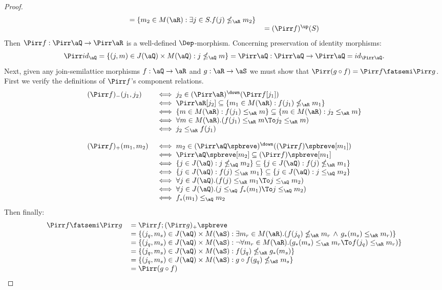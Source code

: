 \documentclass{article}
\begin{document}
\begin{proof}
\[\begin{tabular}{lll}
$= \{ m_2 \in M(\aR) : \exists j \in S. f(j)  \nleq_\aR m_2  \}$
\\&
$= (\Pirr f)^\up(S)$
\end{tabular}
\]
Then $\Pirr f : \Pirr \aQ \to  \Pirr\aR$ is a well-defined $\Dep$-morphism. Concerning preservation of identity morphisms:
\[
\Pirr id_\aQ 
= \{ (j,m) \in J(\aQ) \times M(\aQ) : j \nleq_\aQ m \} 
= \Pirr\aQ : \Pirr\aQ \to \Pirr\aQ
= id_{\Pirr\aQ}.
\]
Next, given any join-semilattice morphisms $f : \aQ \to \aR$ and $g : \aR \to \aS$ we must show that $\Pirr( g \circ f) = \Pirr f \fatsemi \Pirr g$. First we verify the definitions of $\Pirr f$'s component relations.
\[
\begin{tabular}{lll}
$(\Pirr f)_- (j_1,j_2)$
&
$\iff j_2 \in (\Pirr\aR)^\down(\Pirr f[j_1])$
\\&
$\iff \Pirr\aR[j_2] \subseteq \{ m_1 \in M(\aR) : f(j_1) \nleq_\aR m_1 \}$
\\&
$\iff \{ m \in M(\aR) : f(j_1) \leq_\aR m \} \subseteq \{ m \in M(\aR) : j_2 \leq_\aR m \}$
\\&
$\iff \forall m \in M(\aR).( f(j_1) \leq_\aR m \To j_2 \leq_\aR m  )$
\\&
$\iff j_2 \leq_\aR f(j_1)$
\\
\\
$(\Pirr f)_+ (m_1,m_2)$
&
$\iff  m_2 \in (\Pirr\aQ\spbreve)^\down((\Pirr f)\spbreve[m_1]) $
\\&
$\iff \Pirr\aQ\spbreve[m_2] \subseteq (\Pirr f)\spbreve[m_1]$
\\&
$\iff \{ j \in J(\aQ) : j \nleq_\aQ m_2 \} \subseteq \{ j \in J(\aQ) : f(j) \nleq_\aR m_1 \}  $
\\&
$\iff \{ j \in J(\aQ) : f(j) \leq_\aR m_1 \} \subseteq \{ j \in J(\aQ) : j \leq_\aQ m_2 \}   $
\\&
$\iff \forall j \in J(\aQ).( f(j) \leq_\aR m_1 \To j \leq_\aQ m_2)$
\\&
$\iff \forall j \in J(\aQ).( j \leq_\aQ f_*(m_1) \To j \leq_\aQ m_2 )$
\\&
$\iff f_*(m_1) \leq_\aQ m_2 $
\end{tabular}
\]
Then finally:
\[
\begin{tabular}{lll}
$\Pirr f \fatsemi \Pirr g$
&
$= \Pirr f ; (\Pirr g)_+\spbreve$
\\&
$= \{ (j_q,m_s) \in J(\aQ) \times M(\aS) : \exists m_r \in M(\aR).( f(j_q) \nleq_\aR m_r \,\land\, g_*(m_s) \leq_\aR m_r  ) \}$
\\&
$= \{ (j_q,m_s) \in J(\aQ) \times M(\aS) : \neg\forall m_r \in M(\aR).( g_*(m_s) \leq_\aR m_r \To  f(j_q) \leq_\aR m_r ) \}$
\\&
$= \{ (j_q,m_s) \in J(\aQ) \times M(\aS) : f(j_q) \nleq_\aR g_*(m_s) \}$
\\&
$= \{ (j_q,m_s) \in J(\aQ) \times M(\aS) : g \circ f(g_q) \nleq_\aS m_s \}$
\\&
$= \Pirr (g \circ f)$
\end{tabular}
\]
\end{proof}
\end{document}
